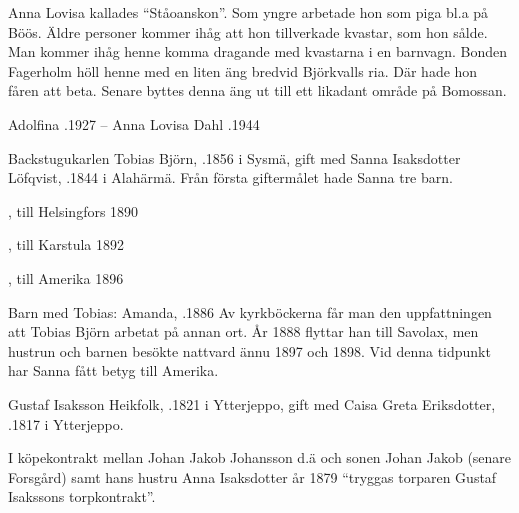 Anna Lovisa kallades ``Ståoanskon''. Som yngre arbetade hon som piga bl.a på Böös. Äldre personer kommer ihåg att hon tillverkade kvastar, som hon sålde. Man kommer ihåg henne komma dragande med kvastarna i en barnvagn. Bonden Fagerholm höll henne med en liten äng bredvid Björkvalls ria. Där hade hon fåren att beta.  Senare byttes denna äng ut till ett likadant område på Bomossan.

Adolfina .1927  --  Anna Lovisa Dahl .1944


Backstugukarlen Tobias Björn, .1856 i Sysmä, gift med Sanna Isaksdotter Löfqvist, .1844 i Alahärmä.
Från första giftermålet hade Sanna tre barn.
\begin{jhchildren}
  \item {}, till Helsingfors 1890
  \item {}, till Karstula 1892
  \item {}, till Amerika 1896
\end{jhchildren}

Barn med Tobias: Amanda, .1886
Av kyrkböckerna får man den uppfattningen att Tobias Björn arbetat på annan ort. År 1888 flyttar han till Savolax, men hustrun och barnen besökte nattvard ännu 1897 och 1898. Vid denna tidpunkt har Sanna fått betyg till Amerika.


Gustaf Isaksson Heikfolk, .1821 i Ytterjeppo, gift med Caisa Greta Eriksdotter, .1817 i Ytterjeppo.
\begin{jhchildren}
  \item {}
  \item {}
  \item {}
  \item {}
  \item {}
  \item {}
  \item {}
  \item {}
  \item {}
\end{jhchildren}
I köpekontrakt mellan Johan Jakob Johansson d.ä och sonen Johan Jakob (senare Forsgård) samt hans hustru Anna Isaksdotter år 1879 ``tryggas torparen Gustaf Isakssons torpkontrakt''.



